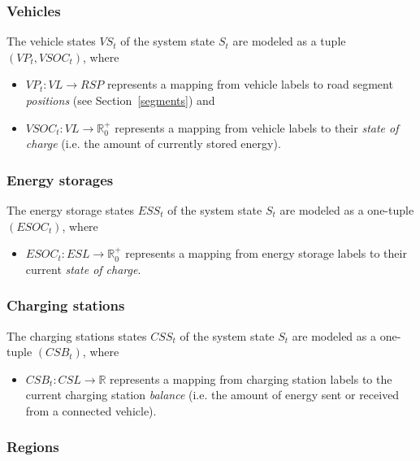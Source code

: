 \subsubsection{Vehicles}
\label{states_vehicles}

The vehicle states $VS_t$ of the system state $S_t$ are modeled as a tuple $(VP_t, VSOC_t)$, where
\begin{itemize}
	\item $VP_t: VL \rightarrow RSP$ represents a mapping from vehicle labels to road segment \textit{positions} (see Section~\ref{segments}) and
	\item $VSOC_t: VL \rightarrow \mathbb{R}_0^+$ represents a mapping from vehicle labels to their \textit{state of charge} (i.e. the amount of currently stored energy).
\end{itemize}

\subsubsection{Energy storages}
\label{states_storages}

The energy storage states $ESS_t$ of the system state $S_t$ are modeled as a one-tuple $(ESOC_t)$, where
\begin{itemize}
	\item $ESOC_t: ESL \rightarrow \mathbb{R}_0^+$ represents a mapping from energy storage labels to their current \textit{state of charge}. 
\end{itemize}

\subsubsection{Charging stations}
\label{states_stations}

The charging stations states $CSS_t$ of the system state $S_t$ are modeled as a one-tuple $(CSB_t)$, where
\begin{itemize}
	\item $CSB_t: CSL \rightarrow \mathbb{R}$ represents a mapping from charging station labels to the current charging station \textit{balance} (i.e. the amount of energy sent or received from a connected vehicle).
\end{itemize}

\subsubsection{Regions}
\label{states_regions}

